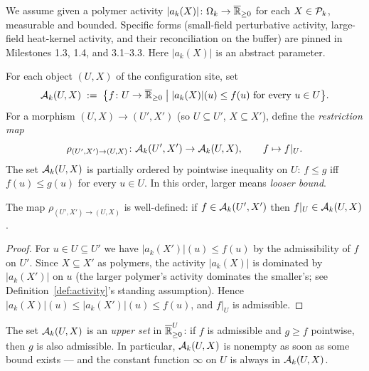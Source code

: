 \begin{definition}
\label{def:activity}
We assume given a polymer activity $|a_k(X)| \colon \Omega_k \to \overline{\mathbb{R}}_{\ge 0}$ for each $X \in \mathcal{P}_k$, measurable and bounded.  Specific forms (small-field perturbative activity, large-field heat-kernel activity, and their reconciliation on the buffer) are pinned in Milestones 1.3, 1.4, and 3.1--3.3.  Here $|a_k(X)|$ is an abstract parameter.
\end{definition}

\begin{definition}
\label{def:Akpresheaf}
For each object $(U, X)$ of the configuration site, set
\begin{equation*}
  \Acal_k(U, X) \;:=\; \big\{ f \colon U \to \Rnnext \;\big|\; |a_k(X)|(u) \le f(u) \ \text{for every}\ u \in U \big\}.
\end{equation*}
For a morphism $(U, X) \to (U', X')$ (so $U \subseteq U'$, $X \subseteq X'$), define the \emph{restriction map}
\begin{equation*}
  \rho_{(U', X') \to (U, X)} \colon \mathcal{A}_k(U', X') \to \mathcal{A}_k(U, X), \qquad f \mapsto f|_U.
\end{equation*}
The set $\mathcal{A}_k(U, X)$ is partially ordered by pointwise inequality on $U$: $f \le g$ iff $f(u) \le g(u)$ for every $u \in U$.  In this order, larger means \emph{looser bound}.
\end{definition}

\begin{lemma}
\label{lem:restriction-stability}
The map $\rho_{(U', X') \to (U, X)}$ is well-defined: if $f \in \mathcal{A}_k(U', X')$ then $f|_U \in \mathcal{A}_k(U, X)$.
\end{lemma}

\begin{proof}
For $u \in U \subseteq U'$ we have $|a_k(X')|(u) \le f(u)$ by the admissibility of $f$ on $U'$.  Since $X \subseteq X'$ as polymers, the activity $|a_k(X)|$ is dominated by $|a_k(X')|$ on $u$ (the larger polymer's activity dominates the smaller's; see Definition~\ref{def:activity}'s standing assumption).  Hence $|a_k(X)|(u) \le |a_k(X')|(u) \le f(u)$, and $f|_U$ is admissible.
\end{proof}

\begin{remark}
The set $\mathcal{A}_k(U, X)$ is an \emph{upper set} in $\overline{\mathbb{R}}_{\ge 0}^U$: if $f$ is admissible and $g \ge f$ pointwise, then $g$ is also admissible.  In particular, $\mathcal{A}_k(U, X)$ is nonempty as soon as some bound exists --- and the constant function $\infty$ on $U$ is always in $\mathcal{A}_k(U, X)$.
\end{remark}

